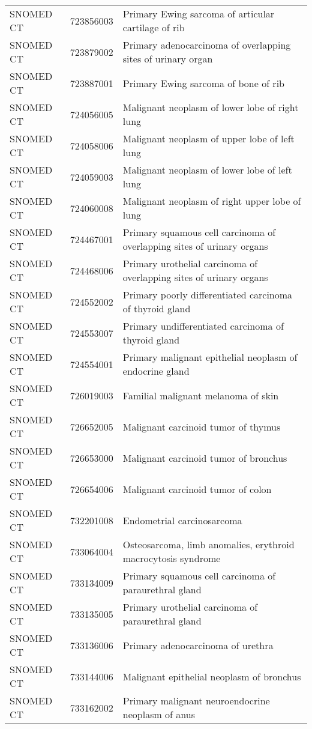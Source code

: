 \begin{longtable}{p{}p{}p{}}
  SNOMED CT & 723856003 & Primary Ewing sarcoma of articular cartilage of rib \\ 
  SNOMED CT & 723879002 & Primary adenocarcinoma of overlapping sites of urinary organ \\ 
  SNOMED CT & 723887001 & Primary Ewing sarcoma of bone of rib \\ 
  SNOMED CT & 724056005 & Malignant neoplasm of lower lobe of right lung \\ 
  SNOMED CT & 724058006 & Malignant neoplasm of upper lobe of left lung \\ 
  SNOMED CT & 724059003 & Malignant neoplasm of lower lobe of left lung \\ 
  SNOMED CT & 724060008 & Malignant neoplasm of right upper lobe of lung \\ 
  SNOMED CT & 724467001 & Primary squamous cell carcinoma of overlapping sites of urinary organs \\ 
  SNOMED CT & 724468006 & Primary urothelial carcinoma of overlapping sites of urinary organs \\ 
  SNOMED CT & 724552002 & Primary poorly differentiated carcinoma of thyroid gland \\ 
  SNOMED CT & 724553007 & Primary undifferentiated carcinoma of thyroid gland \\ 
  SNOMED CT & 724554001 & Primary malignant epithelial neoplasm of endocrine gland \\ 
  SNOMED CT & 726019003 & Familial malignant melanoma of skin \\ 
  SNOMED CT & 726652005 & Malignant carcinoid tumor of thymus \\ 
  SNOMED CT & 726653000 & Malignant carcinoid tumor of bronchus \\ 
  SNOMED CT & 726654006 & Malignant carcinoid tumor of colon \\ 
  SNOMED CT & 732201008 & Endometrial carcinosarcoma \\ 
  SNOMED CT & 733064004 & Osteosarcoma, limb anomalies, erythroid macrocytosis syndrome \\ 
  SNOMED CT & 733134009 & Primary squamous cell carcinoma of paraurethral gland \\ 
  SNOMED CT & 733135005 & Primary urothelial carcinoma of paraurethral gland \\ 
  SNOMED CT & 733136006 & Primary adenocarcinoma of urethra \\ 
  SNOMED CT & 733144006 & Malignant epithelial neoplasm of bronchus \\ 
  SNOMED CT & 733162002 & Primary malignant neuroendocrine neoplasm of anus \\ 

\end{longtable}
